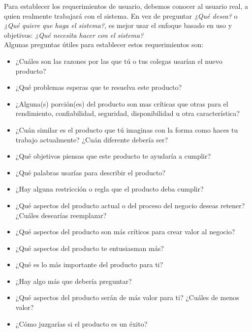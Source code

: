             Para establecer los requerimientos de usuario, debemos conocer al usuario real, a quien realmente trabajará con el sistema. En vez de preguntar \textit{¿Qué desea?} o \textit{¿Qué quiere que haga el sistema?}, es mejor usar el enfoque basado en uso y objetivos: \textit{¿Qué necesita hacer con el sistema?}\\
            
            Algunas preguntas útiles para establecer estos requerimientos son:
            
            \begin{multicols}{2}
                \begin{itemize}
                    \item ¿Cuáles son las razones por las que tú o tus colegas usarían el nuevo producto?
                    \item ¿Qué problemas esperas que te resuelva este producto?
                    \item ¿Alguna(s) porción(es) del producto son mas críticas que otras para el rendimiento, confiabilidad, seguridad, disponibilidad u otra característica?
                    \item ¿Cuán  similar es el producto que tú imaginas con la forma como haces tu trabajo actualmente? ¿Cuán diferente debería ser?
                    \item ¿Qué objetivos piensas que este producto te ayudaría a cumplir?
                    \item ¿Qué palabras usarías para describir el producto?
                    \item ¿Hay alguna restricción o regla que el producto deba cumplir?
                    \item ¿Qué aspectos del producto actual o del proceso del negocio deseas retener? ¿Cuáles desearías reemplazar?
                    \item ¿Qué aspectos del producto son más críticos para crear valor al negocio?
                    \item ¿Qué aspectos del producto te entusiasman más?
                    \item ¿Qué es lo más importante del producto para ti?
                    \item ¿Hay algo más que debería preguntar?
                    \item ¿Qué aspectos del producto serán de más valor para ti? ¿Cuáles de menos valor?
                    \item ¿Cómo juzgarías si el producto es un éxito?

\end{itemize}
\end{multicols}
